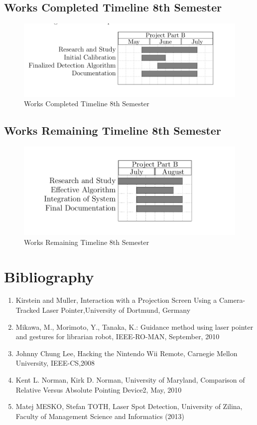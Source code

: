\documentclass[12pt, a4paper]{article}
\begin{document}
\subsection{Works Completed Timeline 8th Semester}
\begin{figure}[htp]
\centering
\includegraphics[scale=0.35]{come8.png}
\caption{Works Completed Timeline 8th Semester}
\label{}
\end{figure}
\newpage
\subsection{Works Remaining Timeline 8th Semester}
\begin{figure}[htp]
\centering
\includegraphics[scale=0.4]{remain8.png}
\caption{Works Remaining Timeline 8th Semester}
\label{}
\end{figure}

\newpage
\section{Bibliography}
\begin{enumerate}
\item Kirstein and Muller, Interaction with a Projection Screen Using a Camera-Tracked Laser Pointer,University of Dortmund, Germany
\item Mikawa, M., Morimoto, Y., Tanaka, K.: Guidance method using laser pointer and gestures for librarian robot, IEEE-RO-MAN, September, 2010
\item Johnny Chung Lee, Hacking the Nintendo Wii Remote, Carnegie Mellon University, IEEE-CS,2008 
\item Kent L. Norman, Kirk D. Norman, University of Maryland, Comparison of Relative Versus Absolute Pointing Device2, May, 2010
\item Matej MESKO, Stefan TOTH, Laser Spot Detection, University of Zilina, Faculty of Management Science and Informatics (2013) 
\end{enumerate}
\end{document}
